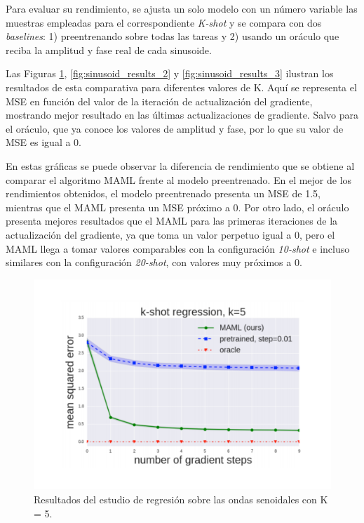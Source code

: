 Para evaluar su rendimiento, se ajusta un solo modelo con un número variable las muestras empleadas para el correspondiente \emph{K-shot} y se compara con dos \emph{baselines}: 1) preentrenando sobre todas las tareas y 2) usando un oráculo que reciba la amplitud y fase real de cada sinusoide.

Las Figuras \ref{fig:sinusoid_results_1}, \ref{fig:sinusoid_results_2} y \ref{fig:sinusoid_results_3} ilustran los resultados de esta comparativa para diferentes valores de K. Aquí se representa el MSE en función del valor de la iteración de actualización del gradiente, mostrando mejor resultado en las últimas actualizaciones de gradiente. Salvo para el oráculo, que ya conoce los valores de amplitud y fase, por lo que su valor de MSE es igual a 0.

En estas gráficas se puede observar la diferencia de rendimiento que se obtiene al comparar el algoritmo MAML frente al modelo preentrenado. En el mejor de los rendimientos obtenidos, el modelo preentrenado presenta un MSE de 1.5, mientras que el MAML presenta un MSE próximo a 0. Por otro lado, el oráculo presenta mejores resultados que el MAML para las primeras iteraciones de la actualización del gradiente, ya que toma un valor perpetuo igual a 0, pero el MAML llega a tomar valores comparables con la configuración \emph{10-shot} e incluso similares con la configuración \emph{20-shot}, con valores muy próximos a 0.

\begin{figure}[H]
\begin{center}
 \includegraphics[width=0.8\linewidth]{Figuras/MAML/sinusoid_1.pdf}
\end{center}
\caption{Resultados del estudio de regresión sobre las ondas senoidales con K = 5.}
 \label{fig:sinusoid_results_1}
\end{figure}

